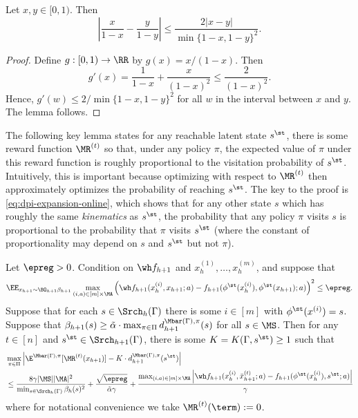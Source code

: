 \begin{lemma}\label{lemma:lipschitz-bound}
Let $x,y \in [0,1)$. Then
\[\left|\frac{x}{1-x} - \frac{y}{1-y}\right| \leq \frac{2|x-y|}{\min\{1-x,1-y\}^2}.\]
\end{lemma}

\begin{proof}
Define $g: [0,1) \to \RR$ by $g(x) = x/(1-x)$. Then 
\[g'(x) = \frac{1}{1-x} + \frac{x}{(1-x)^2} \leq \frac{2}{(1-x)^2}.\]
Hence, $g'(w) \leq 2/\min\{1-x,1-y\}^2$ for all $w$ in the interval between $x$ and $y$. The lemma follows.
\end{proof}



The following key lemma states for any reachable latent state $s^\st$, there is some reward function $\MR^{(t)}$ so that, under any policy $\pi$, the expected value of $\pi$ under this reward function is roughly proportional to the visitation probability of $s^\st$. Intuitively, this is important because optimizing with respect to $\MR^{(t)}$ then approximately optimizes the probability of reaching $s^\st$. The key to the proof is \cref{eq:dpi-expansion-online}, which shows that for any other state $s$ which has roughly the same \emph{kinematics} as $s^\st$, the probability that any policy $\pi$ visits $s$ is proportional to the probability that $\pi$ visits $s^\st$ (where the constant of proportionality may depend on $s$ and $s^\st$ but not $\pi$).

\begin{lemma}\label{lemma:target-error-online}
Let $\epreg>0$. Condition on $\wh f_{h+1}$ and $x_h^{(1)},\dots,x_h^{(m)}$, and suppose that 
\begin{equation}\EE_{x_{h+1}\sim\BO_{h+1}\beta_{h+1}} \max_{(i,a)\in [m]\times\MA} \left(\wh f_{h+1}(x_h^{(i)},x_{h+1};a) - f_{h+1}(\phi^\st(x_h^{(i)}),\phi^\st(x_{h+1});a)\right)^2 \leq \epreg.\label{eq:reg-bound-applied}\end{equation}
Suppose that for each $s \in \Srch_h(\Gamma)$ there is some $i \in [m]$ with $\phi^\st(x^{(i)}) = s$. Suppose that $\beta_{h+1}(s) \geq \tilde \alpha \cdot \max_{\pi\in\Pi} d^{\Mbar(\Gamma),\pi}_{h+1}(s)$ for all $s \in \MS$. Then for any $t \in [n]$ and $s^\st \in \Srch_{h+1}(\Gamma)$, there is some $K = K(\Gamma,s^\st) \geq 1$ such that
\begin{align*}
&\max_{\pi\in\Pi} \left|\E^{\Mbar(\Gamma),\pi}[\MR^{(t)}(x_{h+1})] - K \cdot d^{\Mbar(\Gamma),\pi}_{h+1}(s^\st)\right| \\ 
&\leq \frac{8\gamma|\MS||\MA|^2}{\min_{s\in\Srch_h(\Gamma)}\beta_h(s)^2} + \frac{\sqrt{\epreg}}{\tilde \alpha \gamma} + \frac{\max_{(i,a)\in[m]\times\MA}\left|\wh f_{h+1}(x_h^{(i)},\bar x_{h+1}^{(t)};a) - f_{h+1}(\phi^\st(x_h^{(i)}),s^\st;a)\right|}{\gamma}
\end{align*}
where for notational convenience we take $\MR^{(t)}(\term) := 0$. %
\end{lemma}

